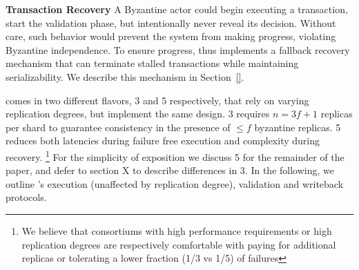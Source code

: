 \par \textbf{Transaction Recovery} A Byzantine actor could begin executing a transaction, start the validation phase, but intentionally never reveal its decision. Without care,
such behavior would prevent the system from making progress, violating Byzantine independence. To ensure progress, \sys{} thus implements a fallback recovery mechanism that can terminate stalled transactions while maintaining serializability. We describe this mechanism in Section~\ref{}.




\iffalse
\sys is designed to be scalable and leaderless. Our architecture reflects this ethos. We briefly summarise it here before going into more detail in the later sections. 
In \sys, clients drive the entire transaction life cycle which can be broken down into three stages as shown in Figure \ref{fig:Figure1}: i) Execution, ii) Validation, and iii) Writeback. 
i) Clients \textit{speculatively execute} transactions themselves, invoking only remote read procedure calls (1) and buffering writes locally (2). \two Clients validate initiate a two-phase commit vote to validate speculative execution results for byzantine-serializability (3).
For every involved shard, a client queries potentially inconsistent replicas for their commitment vote, reconciles divergent votes into a single per-shard decision that maintains Isolation, and make this decision durable to avoid replay of contradictory decisions (4). 
iii) Lastly, clients aggregate all shard decisions (5) for atomic commit, return to the application and asynchronously, \textit{writes back} decisions and database updates (6).

Next, we outline the protocols for Execution, Validation and Writeback respectively. 
\fi







\iffalse
{}
\sys comes in two different flavors, \sys{}3 and \sys{}5 respectively, that rely on varying replication degrees, but implement the same design. \sys{}3 requires $n=3f+1$ replicas  per shard to guarantee consistency in the presence of $\leq f$ byzantine replicas. \sys{}5 reduces both latencies during failure free execution and complexity during recovery. \footnote{We believe that consortiums with high performance requirements or high replication degrees are respectively comfortable with paying for additional replicas or tolerating a lower fraction (1/3 vs 1/5) of failures}
For the simplicity of exposition we discuss \sys{}5 for the remainder of the paper, and defer to section X  to describe differences in \sys{}3. In the following, we outline \sys 's execution (unaffected by replication degree), validation and writeback protocols.

